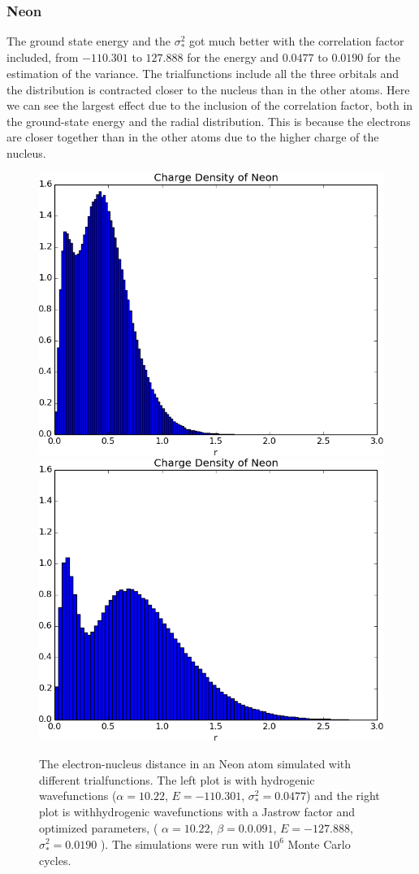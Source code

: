 		
	\subsubsection{Neon}
		The ground state energy and the \(\sigma_*^2\) got much better with the correlation factor included, from \(-110.301\) to \(127.888\) for the energy and  \( 0.0477 \) to \( 0.0190 \) for the estimation of the variance. The trialfunctions include all the three orbitals and the distribution is contracted closer to the nucleus than in the other atoms. Here we can see the largest effect due to the inclusion of the correlation factor, both in the ground-state energy and the radial distribution. This is because the electrons are closer together than in the other atoms due to the higher charge of the nucleus.
		\begin{figure}
			\centering \includegraphics[width=0.45\linewidth]{../figures/used/ChargeDensityNeonSimple}
			\centering \includegraphics[width=0.45\linewidth]{../figures/used/ChargeDensityNeon}
			\protect\caption{The electron-nucleus distance in an Neon atom simulated with different trialfunctions. The left plot is with hydrogenic wavefunctions ($\alpha = 10.22$, $E = -110.301$, $\sigma^2_* = 0.0477$) and the right plot is withhydrogenic wavefunctions with a Jastrow factor and optimized parameters, ( $\alpha = 10.22$, $\beta = 0.0.091$,  $E = -127.888$, $\sigma^2_* = 0.0190$ ). The simulations were run with \(10^6\) Monte Carlo cycles.}
			\label{fig:chargeDensityNeon}
		\end{figure}

